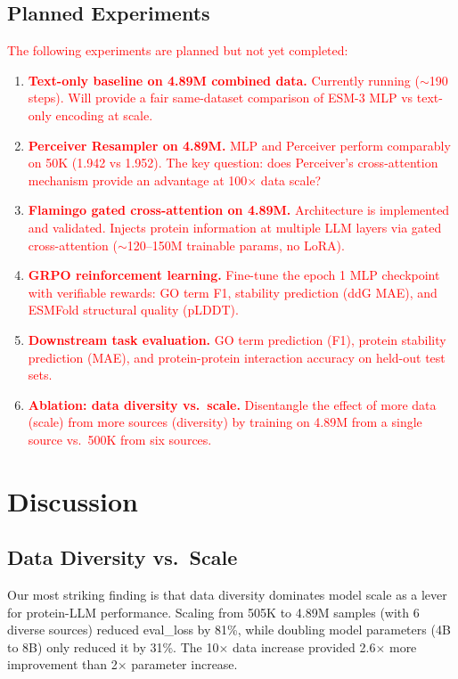 \documentclass[11pt]{article}
\begin{document}
\subsection{Planned Experiments}

\textcolor{red}{The following experiments are planned but not yet completed:}

\begin{enumerate}[leftmargin=*,itemsep=2pt]
    \item \textcolor{red}{\textbf{Text-only baseline on 4.89M combined data.} Currently running ($\sim$190 steps). Will provide a fair same-dataset comparison of ESM-3 MLP vs text-only encoding at scale.}
    \item \textcolor{red}{\textbf{Perceiver Resampler on 4.89M.} MLP and Perceiver perform comparably on 50K (1.942 vs 1.952). The key question: does Perceiver's cross-attention mechanism provide an advantage at 100$\times$ data scale?}
    \item \textcolor{red}{\textbf{Flamingo gated cross-attention on 4.89M.} Architecture is implemented and validated. Injects protein information at multiple LLM layers via gated cross-attention ($\sim$120--150M trainable params, no LoRA).}
    \item \textcolor{red}{\textbf{GRPO reinforcement learning.} Fine-tune the epoch 1 MLP checkpoint with verifiable rewards: GO term F1, stability prediction (ddG MAE), and ESMFold structural quality (pLDDT).}
    \item \textcolor{red}{\textbf{Downstream task evaluation.} GO term prediction (F1), protein stability prediction (MAE), and protein-protein interaction accuracy on held-out test sets.}
    \item \textcolor{red}{\textbf{Ablation: data diversity vs.\ scale.} Disentangle the effect of more data (scale) from more sources (diversity) by training on 4.89M from a single source vs.\ 500K from six sources.}
\end{enumerate}

\section{Discussion}

\subsection{Data Diversity vs.\ Scale}

Our most striking finding is that data diversity dominates model scale as a lever for protein-LLM performance. Scaling from 505K to 4.89M samples (with 6 diverse sources) reduced eval\_loss by 81\%, while doubling model parameters (4B to 8B) only reduced it by 31\%. The 10$\times$ data increase provided 2.6$\times$ more improvement than 2$\times$ parameter increase.
\end{document}
